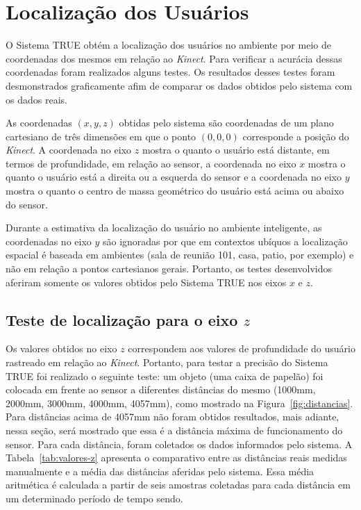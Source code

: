 \section{Localização dos Usuários}
\label{sec:testes-localizacao}

O Sistema TRUE obtém a localização dos usuários no ambiente por meio de
coordenadas dos mesmos em relação ao \textit{Kinect}. Para verificar a acurácia
dessas coordenadas foram realizados alguns testes. Os resultados desses testes
foram desmonstrados graficamente afim de comparar os dados obtidos
pelo sistema com os dados reais.

As coordenadas $\displaystyle (x, y, z)$ obtidas pelo sistema são coordenadas de
um plano cartesiano de três dimensões em que o ponto $\displaystyle (0, 0, 0)$
corresponde a posição do \textit{Kinect}. A coordenada no eixo  $\displaystyle
z$ mostra o quanto o usuário está distante, em termos de profundidade, em
relação ao sensor, a coordenada no eixo  $\displaystyle x$ mostra o quanto o
usuário está a direita ou a esquerda do sensor e a coordenada no eixo 
$\displaystyle y$ mostra o quanto o centro de massa geométrico do usuário está
acima ou abaixo do sensor.

Durante a estimativa da localização do usuário no ambiente inteligente, as
coordenadas no eixo  $\displaystyle y$ são ignoradas por que em contextos
ubíquos a localização espacial é baseada em ambientes (sala de
reunião 101, casa, patio, por exemplo) e não em relação a pontos cartesianos
gerais. Portanto, os testes desenvolvidos aferiram somente os valores obtidos
pelo Sistema TRUE nos eixos $\displaystyle x$ e $\displaystyle z$.

\subsection{Teste de localização para o eixo $\displaystyle z$}

	Os valores obtidos no eixo $\displaystyle z$ correspondem aos valores de
	profundidade do usuário rastreado em relação ao \textit{Kinect}. Portanto, para
	testar a precisão do Sistema TRUE foi realizado o seguinte teste: um objeto (uma
	caixa de papelão) foi colocada em frente ao sensor a diferentes distâncias do
	mesmo (1000mm, 2000mm, 3000mm, 4000mm, 4057mm), como mostrado
	na Figura~\ref{fig:distancias}. Para distâncias acima de 4057mm não foram
	obtidos resultados, mais adiante, nessa seção, será mostrado que essa é a
	distância máxima de funcionamento do sensor. Para cada distância, foram
	coletados os dados informados pelo sistema. A Tabela~\ref{tab:valores-z}
	apresenta o comparativo entre as distâncias reais medidas manualmente e a
	média das distâncias aferidas pelo sistema. Essa média aritmética é calculada
	a partir de seis amostras coletadas para cada distância em um determinado período de tempo sendo.


